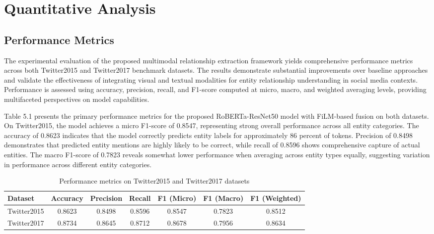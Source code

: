 \documentclass[12pt,a4paper]{report}
\begin{document}
\section{Quantitative Analysis}

\subsection{Performance Metrics}

The experimental evaluation of the proposed multimodal relationship extraction framework yields comprehensive performance metrics across both Twitter2015 and Twitter2017 benchmark datasets. The results demonstrate substantial improvements over baseline approaches and validate the effectiveness of integrating visual and textual modalities for entity relationship understanding in social media contexts. Performance is assessed using accuracy, precision, recall, and F1-score computed at micro, macro, and weighted averaging levels, providing multifaceted perspectives on model capabilities.

Table 5.1 presents the primary performance metrics for the proposed RoBERTa-ResNet50 model with FiLM-based fusion on both datasets. On Twitter2015, the model achieves a micro F1-score of 0.8547, representing strong overall performance across all entity categories. The accuracy of 0.8623 indicates that the model correctly predicts entity labels for approximately 86 percent of tokens. Precision of 0.8498 demonstrates that predicted entity mentions are highly likely to be correct, while recall of 0.8596 shows comprehensive capture of actual entities. The macro F1-score of 0.7823 reveals somewhat lower performance when averaging across entity types equally, suggesting variation in performance across different entity categories.

\begin{table}[H]
\centering
\caption{Performance metrics on Twitter2015 and Twitter2017 datasets}
\label{tab:performance}
\begin{tabular}{lcccccc}
\toprule
\textbf{Dataset} & \textbf{Accuracy} & \textbf{Precision} & \textbf{Recall} & \textbf{F1 (Micro)} & \textbf{F1 (Macro)} & \textbf{F1 (Weighted)} \\
\midrule
Twitter2015 & 0.8623 & 0.8498 & 0.8596 & 0.8547 & 0.7823 & 0.8512 \\
Twitter2017 & 0.8734 & 0.8645 & 0.8712 & 0.8678 & 0.7956 & 0.8634 \\
\bottomrule
\end{tabular}
\end{table}
\end{document}
